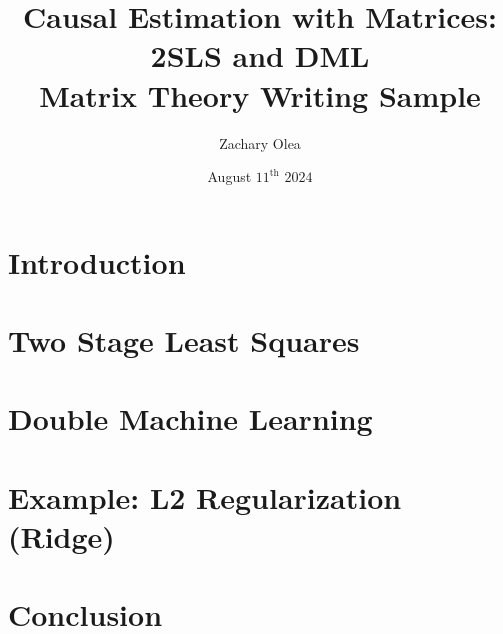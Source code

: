 \documentclass{article}
\title{Causal Estimation with Matrices: 2SLS and DML\\Matrix Theory Writing Sample}
\author{Zachary Olea}
\date{August $11^{\text{th}}$ $2024$}
\begin{document}
\maketitle
\section{Introduction}

\section{Two Stage Least Squares}

\section{Double Machine Learning}

\section{Example: L2 Regularization (Ridge)}

\section{Conclusion}





\end{document}
